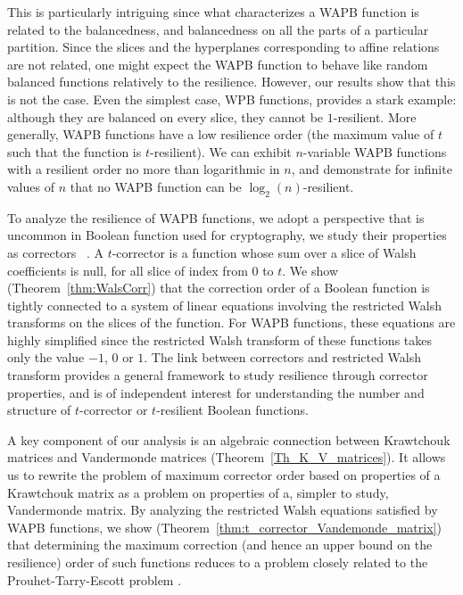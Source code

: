 \documentclass[11pt]{llncs}
\begin{document}
This is particularly intriguing since what characterizes a WAPB function is related to the balancedness, and balancedness on all the parts of a particular partition.
Since the slices and the hyperplanes corresponding to affine relations are not related, one might expect the WAPB function to behave like random balanced functions relatively to the resilience.
However, our results show that this is not the case.
Even the simplest case, WPB functions, provides a stark example: although they are balanced on every slice, they cannot be $1$-resilient.
More generally, WAPB functions have a low resilience order (the maximum value of $t$ such that the function is $t$-resilient).
We can exhibit $n$-variable WAPB functions with a resilient order no more than logarithmic in $n$, and
demonstrate for infinite values of $n$ that no WAPB function can be $\log_2(n)$-resilient.

\medskip

To analyze the resilience of WAPB functions, we adopt a perspective that is uncommon in Boolean function used for cryptography, we study their properties as correctors \eg ~\cite{IEEE:Lacharme09,DCC:LWZS24,DCC:HuZhangWu26}.
A $t$-corrector is a function whose sum over a slice of Walsh coefficients is null, for all slice of index from $0$ to $t$.
We show (Theorem~\ref{thm:WalsCorr}) that the correction order of a Boolean function is tightly connected to a system of linear equations involving the restricted Walsh transforms on the slices of the function.
For WAPB functions, these equations are highly simplified since the restricted Walsh transform of these functions takes only the value $-1$, $0$ or $1$.
The link between correctors and restricted Walsh transform provides a general framework to study resilience through corrector properties, and is of independent interest for understanding the number and structure of $t$-corrector or $t$-resilient Boolean functions.


A key component of our analysis is an algebraic connection between Krawtchouk matrices and Vandermonde matrices (Theorem~\ref{Th_K_V_matrices}).
It allows us to rewrite the problem of maximum corrector order based on properties of a Krawtchouk matrix as a problem on properties of a, simpler to study, Vandermonde matrix.
By analyzing the restricted Walsh equations satisfied by WAPB functions, we show (Theorem~\ref{thm:t_corrector_Vandemonde_matrix}) that determining the maximum correction (and hence an upper bound on the resilience) order of such functions reduces to a problem closely related to the Prouhet-Tarry-Escott problem \eg \cite{Borwein2002}.
\end{document}
